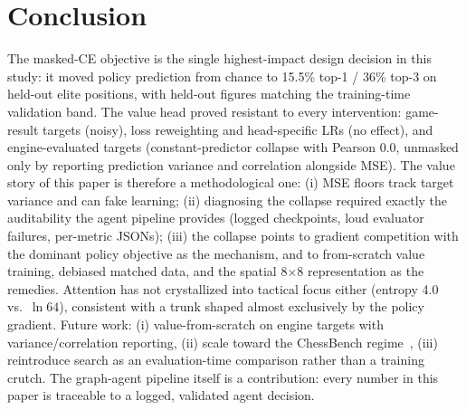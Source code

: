 \documentclass[conference,onecolumn]{IEEEtran}
\begin{document}
\section{Conclusion}
The masked-CE objective is the single highest-impact design decision in this study: it moved policy prediction from chance to 15.5\% top-1 / 36\% top-3 on held-out elite positions, with held-out figures matching the training-time validation band. The value head proved resistant to every intervention: game-result targets (noisy), loss reweighting and head-specific LRs (no effect), and engine-evaluated targets (constant-predictor collapse with Pearson 0.0, unmasked only by reporting prediction variance and correlation alongside MSE). The value story of this paper is therefore a methodological one: (i) MSE floors track target variance and can fake learning; (ii) diagnosing the collapse required exactly the auditability the agent pipeline provides (logged checkpoints, loud evaluator failures, per-metric JSONs); (iii) the collapse points to gradient competition with the dominant policy objective as the mechanism, and to from-scratch value training, debiased matched data, and the spatial 8$\times$8 representation as the remedies. Attention has not crystallized into tactical focus either (entropy 4.0 vs.\ $\ln 64$), consistent with a trunk shaped almost exclusively by the policy gradient. Future work: (i) value-from-scratch on engine targets with variance/correlation reporting, (ii) scale toward the ChessBench regime~\cite{Ruoss2024_2402_04494}, (iii) reintroduce search as an evaluation-time comparison rather than a training crutch. The graph-agent pipeline itself is a contribution: every number in this paper is traceable to a logged, validated agent decision.


\end{document}
